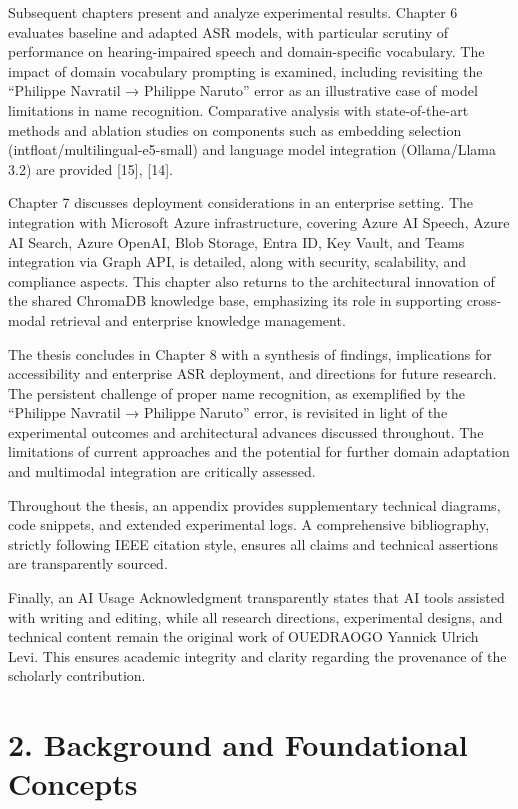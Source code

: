 \documentclass[12pt,a4paper]{article}
\begin{document}
Subsequent chapters present and analyze experimental results. Chapter 6 evaluates baseline and adapted ASR models, with particular scrutiny of performance on hearing-impaired speech and domain-specific vocabulary. The impact of domain vocabulary prompting is examined, including revisiting the “Philippe Navratil → Philippe Naruto” error as an illustrative case of model limitations in name recognition. Comparative analysis with state-of-the-art methods and ablation studies on components such as embedding selection (intfloat/multilingual-e5-small) and language model integration (Ollama/Llama 3.2) are provided [15], [14].


Chapter 7 discusses deployment considerations in an enterprise setting. The integration with Microsoft Azure infrastructure, covering Azure AI Speech, Azure AI Search, Azure OpenAI, Blob Storage, Entra ID, Key Vault, and Teams integration via Graph API, is detailed, along with security, scalability, and compliance aspects. This chapter also returns to the architectural innovation of the shared ChromaDB knowledge base, emphasizing its role in supporting cross-modal retrieval and enterprise knowledge management.


The thesis concludes in Chapter 8 with a synthesis of findings, implications for accessibility and enterprise ASR deployment, and directions for future research. The persistent challenge of proper name recognition, as exemplified by the “Philippe Navratil → Philippe Naruto” error, is revisited in light of the experimental outcomes and architectural advances discussed throughout. The limitations of current approaches and the potential for further domain adaptation and multimodal integration are critically assessed.


Throughout the thesis, an appendix provides supplementary technical diagrams, code snippets, and extended experimental logs. A comprehensive bibliography, strictly following IEEE citation style, ensures all claims and technical assertions are transparently sourced.


Finally, an AI Usage Acknowledgment transparently states that AI tools assisted with writing and editing, while all research directions, experimental designs, and technical content remain the original work of OUEDRAOGO Yannick Ulrich Levi. This ensures academic integrity and clarity regarding the provenance of the scholarly contribution.


\section{2. Background and Foundational Concepts}
\end{document}
